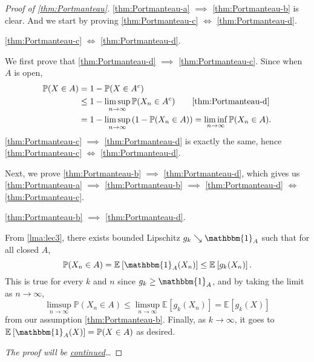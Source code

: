 \begin{proof}[Proof of \autoref{thm:Portmanteau}]\let\qed\relax
	\autoref{thm:Portmanteau-a} \(\implies \) \autoref{thm:Portmanteau-b} is clear. And we start by proving \autoref{thm:Portmanteau-c} \(\iff \) \autoref{thm:Portmanteau-d}.
	\begin{claim}
		\autoref{thm:Portmanteau-c} \(\iff \) \autoref{thm:Portmanteau-d}.
	\end{claim}
	\begin{explanation}
		We first prove that \autoref{thm:Portmanteau-d} \(\implies \) \autoref{thm:Portmanteau-c}. Since when \(A\) is open,
		\begin{align*}
			\mathbb{P} (X \in A)
			 & = 1 - \mathbb{P} (X \in A^{c} )                                                                            \\
			 & \leq 1 - \limsup_{n \to \infty} \mathbb{P} (X_n \in A^{c} )             \tag*{\autoref{thm:Portmanteau-d}} \\
			 & = 1 - \limsup_{n \to \infty} \left( 1 - \mathbb{P} (X_n \in A ) \right)
			= \liminf_{n \to \infty} \mathbb{P} (X_n \in A).
		\end{align*}
		\autoref{thm:Portmanteau-c} \(\implies \) \autoref{thm:Portmanteau-d} is exactly the same, hence \autoref{thm:Portmanteau-c} \(\iff \) \autoref{thm:Portmanteau-d}.
	\end{explanation}

	Next, we prove \autoref{thm:Portmanteau-b} \(\implies \) \autoref{thm:Portmanteau-d}, which gives us \autoref{thm:Portmanteau-a} \(\implies \) \autoref{thm:Portmanteau-b} \(\implies \) \autoref{thm:Portmanteau-d} \(\iff \) \autoref{thm:Portmanteau-c}.

	\begin{claim}
		\autoref{thm:Portmanteau-b} \(\implies \) \autoref{thm:Portmanteau-d}.
	\end{claim}
	\begin{explanation}
		From \autoref{lma:lec3}, there exists bounded Lipschitz \(g_k \searrow \mathbbm{1}_{A} \) such that for all closed \(A\),
		\[
			\mathbb{P} (X_n \in A)
			= \mathbb{E}_{}\left[\mathbbm{1}_{A} (X_n) \right]
			\leq \mathbb{E}_{}\left[g_k(X_n) \right].
		\]
		This is true for every \(k\) and \(n\) since \(g_k \geq \mathbbm{1}_{A} \), and by taking the limit as \(n \to \infty \),
		\[
			\limsup_{n \to \infty} \mathbb{P} (X_n \in A)
			\leq \limsup_{n \to \infty} \mathbb{E}_{}\left[g_k(X_n) \right]
			= \mathbb{E}_{}\left[g_k(X) \right]
		\]
		from our assumption \autoref{thm:Portmanteau-b}. Finally, as \(k \to \infty \), it goes to \(\mathbb{E}_{}\left[\mathbbm{1}_{A} (X) \right]
		= \mathbb{P} (X \in A)\) as desired.
	\end{explanation}
	\emph{The proof will be \hyperref[pf:thm:Portmanteau-cont]{continued}\dots}
\end{proof}